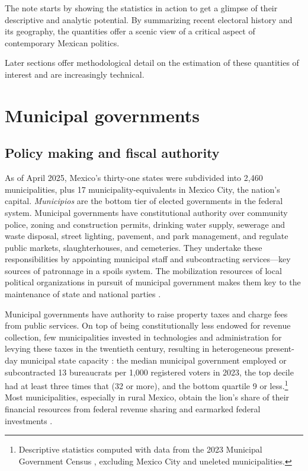 \documentclass[letter,12pt]{article}
\begin{document}
The note starts by showing the statistics in action to get a glimpse of their descriptive and analytic potential. By summarizing recent electoral history and its geography, the quantities offer a scenic view of a critical aspect of contemporary Mexican politics. 

Later sections offer methodological detail on the estimation of these quantities of interest and are increasingly technical. 

\section{Municipal governments}
\subsection{Policy making and fiscal authority}
As of April 2025, Mexico's thirty-one states were subdivided into 2,460 municipalities, plus 17 municipality-equivalents in Mexico City, the nation's capital. \emph{Municipios} are the bottom tier of elected governments in the federal system. Municipal governments have constitutional authority over community police, zoning and construction permits, drinking water supply, sewerage and waste disposal, street lighting, pavement, and park management, and regulate public markets, slaughterhouses, and cemeteries. They undertake these responsibilities by appointing municipal staff and subcontracting services---key sources of patronnage in a spoils system. The mobilization resources of local political organizations in pursuit of municipal government makes them key to the maintenance of state and national parties \citep{coppedge.MxVen.1993, key.1964, sorauf.1959, rosas.lucardi.Brokers.2019}. 

Municipal governments have authority to raise property taxes and charge fees from public services. On top of being constitutionally less endowed for revenue collection, few municipalities invested in technologies and administration for levying these taxes in the twentieth century, resulting in heterogeneous present-day municipal state capacity \citep{garfias.state.cap.2018}: the median municipal government employed or subcontracted 13 bureaucrats per 1,000 registered voters in 2023, the top decile had at least three times that (32 or more), and the bottom quartile 9 or less.\footnote{Descriptive statistics computed with data from the 2023 Municipal Government Census \citep{inegi.CensoGobMun2023}, excluding Mexico City and uneleted municipalities.} Most municipalities, especially in rural Mexico, obtain the lion's share of their financial resources from federal revenue sharing and earmarked federal investments \citep{diaz.cayeros.2006, figueroa-mansur-itam.2024}.
\end{document}
